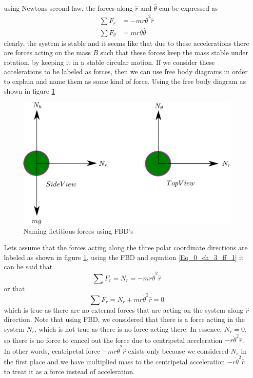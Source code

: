 using Newtons second law, the forces along $\hat{r}$ and $\hat{\theta}$ can be expressed as
\begin{align}
	\sum F_{r} &= - m r \dot{\theta}^{2} \hat{r} \label{Eq_0_ch_3_ff_1} \\
	\sum F_{\theta} &= m r \ddot{\theta} \hat{\theta}
\end{align}
clearly, the system is stable and it seems like that due to these accelerations there are forces acting on the mass $B$ such that these forces keep the mass stable under rotation, by keeping it in a stable circular motion. If we consider these accelerations to be labeled as forces, then we can use free body diagrams in order to explain and name them as some kind of force. Using the free body diagram as shown in figure \ref{Fig_0_ch_3_fictitiousForces1_1}
\newpage
\begin{figure}[h!]
	\centering
	\includegraphics[width=0.7\linewidth]{Bilder/16_FictitiousForces1_1.pdf}
	\caption{Naming fictitious forces using FBD's}
	\label{Fig_0_ch_3_fictitiousForces1_1}
\end{figure}
Lets assume that the forces acting along the three polar coordinate directions are labeled as shown in figure \ref{Fig_0_ch_3_fictitiousForces1_1}, using the FBD and equation \eqref{Eq_0_ch_3_ff_1} it can be said that
\begin{equation}
	\sum F_{r} = N_{r} = - m r \dot{\theta}^{2} \hat{r}
\end{equation}
or that
\begin{equation}
\sum F_{r} = N_{r} + m r \dot{\theta}^{2} \hat{r} = 0
\end{equation}
which is true as  there are no external forces that are acting on the system along $\hat{r}$ direction. Note that using FBD, we considered that there is a force acting in the system $N_{r}$, which is not true as there is no force acting there. In essence, $N_{r} = 0$, so there is no force to cancel out the force due to centripetal acceleration $- r \dot{\theta}^{2} \hat{r}$. In other words, centripetal force $- m r \dot{\theta}^{2} \hat{r}$ exists only because we considered $N_r$ in the first place and we have multiplied mass to the centripetal acceleration $- r \dot{\theta}^{2} \hat{r}$ to treat it as a force instead of acceleration.

